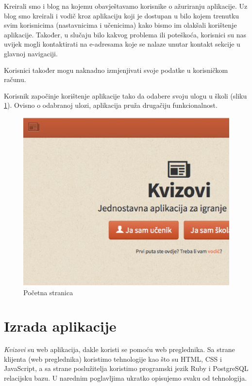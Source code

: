 \documentclass[11pt]{scrreprt}
\begin{document}
Kreirali smo i blog na kojemu obavještavamo korisnike o ažuriranju aplikacije.
Uz blog smo kreirali i vodič kroz aplikaciju koji je dostupan u bilo kojem
trenutku svim korisnicima (nastavnicima i učenicima) kako bismo im olakšali
korištenje aplikacije. Također, u slučaju bilo kakvog problema ili poteškoća,
korisnici su nas uvijek mogli kontaktirati na e-adresama koje se nalaze unutar
kontakt sekcije u glavnoj navigaciji.\cite{krug05}

Korisnici također mogu naknadno izmjenjivati svoje podatke u korisničkom
računu.

\pagebreak

Korisnik započinje korištenje aplikacije tako da odabere svoju ulogu u školi
(sliku \ref{fig:home}). Ovisno o odabranoj ulozi, aplikacija pruža drugačiju
funkcionalnost.

\begin{figure}[H]
  \includegraphics[width=\textwidth, clip=true, trim=0 7cm 0 0, fbox]{home}
  \caption{Početna stranica}
  \label{fig:home}
\end{figure}

\section{Izrada aplikacije}

\emph{Kvizovi} su web aplikacija, dakle koristi se pomoću web preglednika. Sa
strane klijenta (web preglednika) koristimo tehnologije kao što su HTML, CSS i
JavaScript, a sa strane poslužitelja koristimo programski jezik Ruby i
PostgreSQL relacijsku bazu. U narednim poglavljima ukratko opisujemo svaku od
tehnologija.
\end{document}
